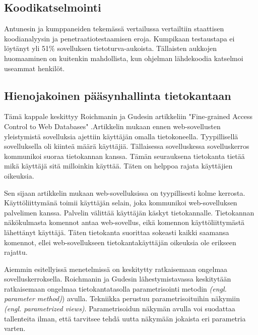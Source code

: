 \documentclass[finnish]{tktltiki2}
\theoremstyle{definition}
\theoremstyle{remark}
\begin{document}
		\subsection{Koodikatselmointi}
		Antunesin ja kumppaneiden tekemässä vertailussa\cite{vertailu} vertailtiin staattisen koodianalyysin ja penetraatiotestaamisen eroja. Kumpikaan testaustapa ei löytänyt yli 51\% sovelluksen tietoturva-aukoista. Tällaisten aukkojen huomaaminen on kuitenkin mahdollista, kun ohjelman lähdekoodia katselmoi useammat henkilöt.
		
		\subsection{Hienojakoinen pääsynhallinta tietokantaan}
		Tämä kappale keskittyy Roichmanin ja Gudesin artikkeliin "Fine-grained Access Control to Web Databases" \cite{access}.\space Artikkelin mukaan ennen web-sovellusten yleistymistä sovelluksia ajettiin käyttäjän omalla tietokoneella. Tyypillisellä sovelluksella oli kiinteä määrä  käyttäjiä. Tällaisessa sovelluskessa sovelluskerros kommunikoi suoraa tietokannan kanssa. Tämän seurauksena tietokanta tietää mikä käyttäjä sitä milloinkin käyttää. Täten on helppoa rajata käyttäjien oikeuksia.
		
		Sen sijaan artikkelin mukaan web-sovelluksissa on tyypillisesti kolme kerrosta. Käyttöliittymänä toimii käyttäjän selain, joka kommunikoi web-sovelluksen palvelimen kanssa. Palvelin välittää käyttäjän käskyt tietokannalle. Tietokannan näkökulmasta komennot antaa web-sovellus, eikä komennon käyttöliittymästä lähettänyt käyttäjä. Täten tietokanta suorittaa sokeasti kaikki saamansa komennot, ellei web-sovellukseen tietokantakäyttäjän oikeuksia ole erikseen rajattu.
		
		Aiemmin esitellyissä menetelmissä on keskitytty ratkaisemaan ongelmaa sovelluskerroksella. Roichmanin ja Gudesin lähestymistavassa keskitytään ratkaisemaan ongelmaa tietokantatasolla parametrisointi metodin \textit{(engl. parameter method)}) avulla. Tekniikka perustuu parametrisoituihin näkymiin \textit{(engl. parametrized views)}. Parametrisoidun näkymän avulla voi suodattaa tallenteita ilman, että tarvitsee tehdä uutta näkymään jokaista eri parametria varten.
		
\end{document}

